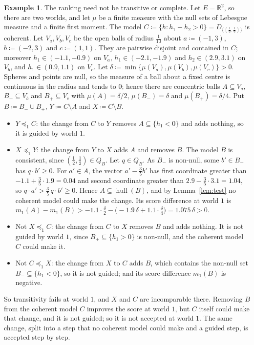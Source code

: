 \documentclass[11pt]{article}
\newcommand{\R}{\mathbb{R}}
\newcommand{\hull}{\operatorname{hull}}
\theoremstyle{plain}
\theoremstyle{definition}
\newtheorem{example}[theorem]{Example}
\theoremstyle{remark}
\begin{document}
\begin{example}\label{ex:intransitive}
The ranking need not be transitive or complete. Let $E=\R^2$, so there are two worlds,
and let $\mu$ be a finite measure with the null sets of Lebesgue measure and a finite first
moment. The model $C\coloneqq\{h:h_1+h_2>0\}=D_{\{(\frac12,\frac12)\}}$ is coherent. Let $V_a,
V_b,V_c$ be the open balls of radius $\frac1{10}$ about $a\coloneqq(-1,3)$, $b\coloneqq(-2,3)$
and $c\coloneqq(1,1)$. They are pairwise disjoint and contained in $C$; moreover $h_1\in(-1.1,
-0.9)$ on $V_a$, $h_1\in(-2.1,-1.9)$ and $h_2\in(2.9,3.1)$ on $V_b$, and $h_1\in(0.9,1.1)$ on
$V_c$. Let $\delta\coloneqq\min\{\mu(V_a),\mu(V_b),\mu(V_c)\}>0$. Spheres and points are null,
so the measure of a ball about a fixed centre is continuous in the radius and tends to $0$;
hence there are concentric balls $A\subseteq V_a$, $B_-\subseteq V_b$ and $B_+\subseteq V_c$
with $\mu(A)=\delta/2$, $\mu(B_-)=\delta$ and $\mu(B_+)=\delta/4$. Put $B\coloneqq B_-\cup B_+$,
$Y\coloneqq C\setminus A$ and $X\coloneqq C\setminus B$.
\begin{itemize}
  \item $Y\preceq_1C$: the change from $C$ to $Y$ removes $A\subseteq\{h_1<0\}$ and adds nothing,
  so it is guided by world $1$.
  \item $X\preceq_1Y$: the change from $Y$ to $X$ adds $A$ and removes $B$. The model $B$ is
  consistent, since $(\frac12,\frac12)\in Q_B$. Let $q\in Q_B$. As $B_-$ is non-null, some
  $b'\in B_-$ has $q\cdot b'\ge0$. For $a'\in A$, the vector $a'-\frac35b'$ has first coordinate
  greater than $-1.1+\frac35\cdot1.9=0.04$ and second coordinate greater than $2.9-\frac35\cdot
  3.1=1.04$, so $q\cdot a'>\frac35\,q\cdot b'\ge0$. Hence $A\subseteq\hull(B)$, and by
  Lemma~\ref{lem:test} no coherent model could make the change. Its score difference at world
  $1$ is $m_1(A)-m_1(B)>-1.1\cdot\frac\delta2-\bigl(-1.9\,\delta+1.1\cdot\frac\delta4\bigr)=
  1.075\,\delta>0$.
  \item Not $X\preceq_1C$: the change from $C$ to $X$ removes $B$ and adds nothing. It is not
  guided by world $1$, since $B_+\subseteq\{h_1>0\}$ is non-null, and the coherent model $C$
  could make it.
  \item Not $C\preceq_1X$: the change from $X$ to $C$ adds $B$, which contains the non-null set
  $B_-\subseteq\{h_1<0\}$, so it is not guided; and its score difference $m_1(B)$ is negative.
\end{itemize}
So transitivity fails at world $1$, and $X$ and $C$ are incomparable there. Removing $B$ from
the coherent model $C$ improves the score at world $1$, but $C$ itself could make that change,
and it is not guided; so it is not accepted at world $1$. The same change, split into a step
that no coherent model could make and a guided step, is accepted step by step.
\end{example}
\end{document}
